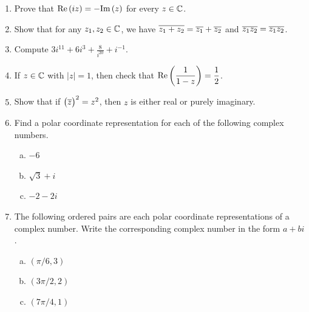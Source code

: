 \documentclass[11pt,fleqn,dvipsnames,usenames]{article}
\begin{document}
\begin{enumerate}
\item Prove that $\text{Re}\left(iz\right) = -\text{Im}\left(z\right)$ for every $z\in\mathbb{C}$.
\item Show that for any $z_{1},z_{2}\in\mathbb{C}$, we have $\overline{z_{1} + z_{2}} = \overline{z_{1}} + \overline{z_{2}}$ and $\overline{z_{1}z_{2}} = \overline{z_{1}}\overline{z_{2}}$.
\item Compute $3i^{11} + 6i^{3} + \frac{8}{i^{20}} + i^{-1}$.
\item If $z\in\mathbb{C}$ with $|z| = 1$, then check that $\text{Re}\left(\dfrac{1}{1-z}\right) = \dfrac{1}{2}$.
\item Show that if $\big(\overline{z}\big)^2 = z^2$, then $z$ is either real or purely imaginary.
\item Find a polar coordinate representation for each of the following complex numbers.
\begin{multicols}{3}
\begin{enumerate}[(a)]
\item $-6$
\item $\sqrt{3} + i$
\item $-2-2i$
\end{enumerate}
\end{multicols}
\item The following ordered pairs are each polar coordinate representations of a complex number.  Write the corresponding complex number in the form $a + bi$.
\begin{multicols}{3}
\begin{enumerate}[(a)]
\item $(\pi/6,3)$
\item $(3\pi/2,2)$
\item $(7\pi/4,1)$
\end{enumerate}
\end{multicols}

\end{enumerate}
\end{document}
